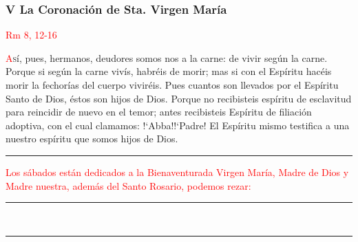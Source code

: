 \documentclass[10pt,twoside]{book}
\begin{document}
\begin{paracol}{2}
\begin{rightcolumn}
\begin{center}
                  \subsubsection*{V La Coronación de Sta. Virgen María}
                  \textcolor{red}{Rm 8, 12-16}
            \end{center}

            \lettrine[lines=2]{\textcolor{red}{A}}sí, pues, hermanos, deudores somos nos a la carne: de vivir según la carne. Porque si según la carne vivís, habréis de morir; mas
            si con el Espíritu hacéis morir la fechorías del cuerpo viviréis. Pues cuantos son llevados por el Espíritu Santo de Dios, éstos son hijos de Dios. Porque no recibisteis
            espíritu de esclavitud para reincidir de nuevo en el temor; antes recibisteis Espíritu de filiación adoptiva, con el cual clamamos: {!`}Abba!{!`}Padre! El Espíritu mismo
            testifica a una nuestro espíritu que somos hijos de Dios.

            
      \end{rightcolumn}
\end{paracol}

\iralfinal

\begin{center}
      {\rule{10em}{0.4pt}}

      \vspace{0.75em}

      \textcolor{red}{Los sábados están dedicados a la Bienaventurada Virgen María, Madre de Dios y Madre nuestra, además del Santo Rosario, podemos rezar:}
\end{center}

\begin{multicols}{2}

      
      
\end{multicols}

\begin{center}
      \begin{spacing}{0.25}
            {\rule{20em}{0.4pt}}\\
            {\rule{20em}{0.4pt}}
      \end{spacing}
\end{center}
\end{document}
